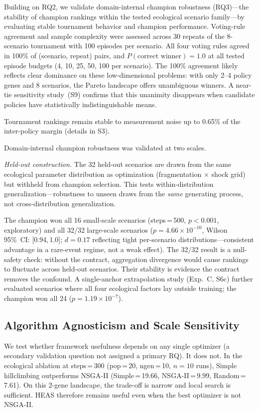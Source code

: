 \documentclass{wscpaperproc}
\begin{document}
Building on RQ2, we validate domain-internal champion robustness (RQ3)---the
stability of champion rankings within the tested ecological scenario family---by evaluating stable tournament behavior and champion performance. Voting-rule agreement and sample complexity
were assessed across 30 repeats of
the 8-scenario tournament with 100 episodes per scenario. All four voting rules
agreed in 100\% of
(scenario, repeat) pairs, and $P(\text{correct winner})\!=\!1.0$ at all tested
episode budgets (4, 10, 25, 50, 100 per scenario). The 100\% agreement likely
reflects clear dominance on these low-dimensional problems: with only 2--4 policy
genes and 8 scenarios, the Pareto landscape offers unambiguous winners. A
near-tie sensitivity study~(S9) confirms that this unanimity disappears when
candidate policies have statistically indistinguishable means.

Tournament rankings remain stable to measurement noise up to 0.65\% of the inter-policy margin (details in S3).

Domain-internal champion robustness was validated at two scales.

\emph{Held-out construction.} The 32 held-out scenarios are drawn from the
same ecological parameter distribution as optimization (fragmentation $\times$
shock grid) but withheld from champion selection. This tests
within-distribution generalization---robustness to unseen draws from the
\emph{same} generating process, not cross-distribution generalization.

The champion won all 16 small-scale scenarios (steps\,=\,500, $p\!<\!0.001$,
exploratory) and all 32/32 large-scale scenarios
($p\!=\!4.66\!\times\!10^{-10}$, Wilson 95\%~CI: [0.94,\,1.0]; $d\!=\!0.17$
reflecting tight per-scenario distributions---consistent advantage in a
rare-event regime, not a weak effect). The 32/32 result is a null-safety
check: without the contract, aggregation divergence would cause rankings to
fluctuate across held-out scenarios. Their stability is evidence the contract
removes the confound. A single-anchor extrapolation study (Exp.~C, S6c)
further evaluated scenarios where all four ecological factors lay outside
training; the champion won all 24 ($p\!=\!1.19\!\times\!10^{-7}$).


\subsection{Algorithm Agnosticism and Scale Sensitivity}
\label{sec:scale}

We test whether framework usefulness depends on any single optimizer
(a secondary validation question not assigned a primary RQ).
It does not. In the ecological ablation at steps\,=\,300
(pop\,=\,20, ngen\,=\,10, $n\!=\!10$ runs), Simple hillclimbing outperforms
NSGA-II (Simple\,=\,19.66, NSGA-II\,=\,9.99, Random\,=\,7.61). On this
2-gene landscape, the trade-off is narrow and local search is sufficient. HEAS
therefore remains useful even when the best optimizer is not NSGA-II.
\end{document}
